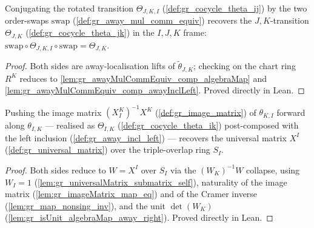 \begin{lemma}

  \label{lem:gr_rotMid}
  Conjugating the rotated transition \(\Theta_{J,K,I}\) (\cref{def:gr_cocycle_theta_ij})
  by the two order-swaps \(\mathrm{swap}\) (\cref{def:gr_away_mul_comm_equiv}) recovers the
  \(J,K\)-transition \(\Theta_{J,K}\) (\cref{def:gr_cocycle_theta_jk}) in the \(I,J,K\) frame:
  \(\mathrm{swap} \circ \Theta_{J,K,I} \circ \mathrm{swap} = \Theta_{J,K}\).
\end{lemma}
\begin{proof}

\leanok
  Both sides are away-localisation lifts of \(\tilde\theta_{J,K}\); checking on the chart ring
  \(R^K\) reduces to \cref{lem:gr_awayMulCommEquiv_comp_algebraMap} and
  \cref{lem:gr_awayMulCommEquiv_comp_awayInclLeft}. Proved directly in Lean.
\end{proof}

\begin{lemma}

  \label{lem:gr_transitionInvImageMatrix}
  Pushing the image matrix \((X^K_I)^{-1} X^K\) (\cref{def:gr_image_matrix}) of \(\theta_{K,I}\)
  forward along \(\theta_{I,K}\) — realised as \(\Theta_{I,K}\) (\cref{def:gr_cocycle_theta_ik})
  post-composed with the left inclusion (\cref{def:gr_away_incl_left}) — recovers the universal
  matrix \(X^I\) (\cref{def:gr_universal_matrix}) over the triple-overlap ring \(S_I\).
\end{lemma}
\begin{proof}

\leanok
  Both sides reduce to \(W = X^I\) over \(S_I\) via the \((W_K)^{-1} W\) collapse, using
  \(W_I = 1\) (\cref{lem:gr_universalMatrix_submatrix_self}), naturality of the image matrix
  (\cref{lem:gr_imageMatrix_map_eq}) and of the Cramer inverse (\cref{lem:gr_map_nonsing_inv}),
  and the unit \(\det(W_K)\) (\cref{lem:gr_isUnit_algebraMap_away_right}). Proved directly in Lean.
\end{proof}

